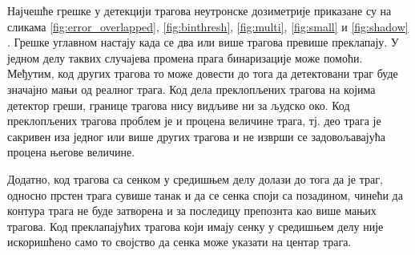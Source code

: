 \documentclass[11pt,a4paper,serbian,oneside]{book}
\begin{document}
Најчешће грешке у детекцији трагова неутронске дозиметрије приказане су на сликама \ref{fig:error_overlapped}, \ref{fig:binthresh}, \ref{fig:multi}, \ref{fig:small} и \ref{fig:shadow} . Грешке углавном настају када се два или више  трагова превише преклапају. У једном делу таквих случајева промена прага бинаризације може помоћи. Међутим, код других трагова то може довести до тога да детектовани траг буде значајно мањи од реалног трага. Код дела преклопљених трагова на којима детектор греши, границе трагова нису видљиве ни за људско око. Код преклопљених трагова проблем је и процена величине трага, тј. део трага је сакривен иза једног или више других трагова и не изврши се задовољавајућа процена његове величине.

Додатно, код трагова са сенком у средишњем делу долази до тога да је траг, односно прстен трага сувише танак и да се сенка споји са позадином, чинећи да контура трага не буде затворена и за последицу препознта као више мањих трагова. Код преклапајућих трагова који имају сенку у средишњем делу није искоришћено само то својство да сенка може указати на центар трага. 
\end{document}
